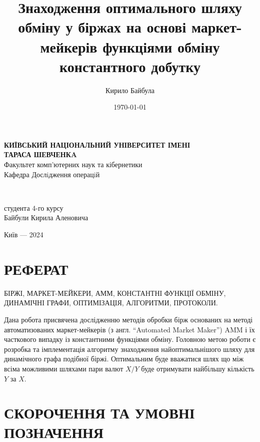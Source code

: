 \documentclass[14pt]{extarticle}
\author{Кирило Байбула}
\date{\today}
\title{Знаходження оптимального шляху обміну у біржах на основі маркет-мейкерів функціями обміну константного добутку}
\begin{document}
\begin{titlepage}
	\begin{center}
		\vspace*{1cm}

		\textbf{КИЇВСЬКИЙ НАЦІОНАЛЬНИЙ УНІВЕРСИТЕТ ІМЕНІ \\ ТАРАСА ШЕВЧЕНКA} \\
		Факультет комп'ютерних наук та кібернетики \\
		Кафедра Дослiдження операцiй

		\vspace{2.0cm}
		\textbf{\THETITLE} \\
		\vspace{1.5cm}
		\begin{flushright}
			студента 4-го курсу \\
			Байбули Кирила Аленовича
		\end{flushright}

		\vfill

		\vspace{0.8cm}
		Київ ---  2024
	\end{center}
\end{titlepage}
\newpage


\section*{РЕФЕРАТ}\label{sec:abstract}

БІРЖІ, МАРКЕТ-МЕЙКЕРИ, АММ, КОНСТАНТНІ ФУНКЦІЇ ОБМІНУ, ДИНАМІЧНІ ГРАФИ,
ОПТИМІЗАЦІЯ, АЛГОРИТМИ, ПРОТОКОЛИ.

Дана робота присвячена дослідженню методів обробки бірж основаних на методі
автоматизованих маркет-мейкерів (з англ. ``Automated Market Maker'') AMM і їх
часткового випадку із константними функціями обміну. Головною метою роботи є
розробка та імплементація алгоритму знаходження найоптимальнішого шляху для
динамічного графа подібної біржі. Оптимальним буде вважатися шлях що між всіма
можливими шляхами пари валют $X/Y$ буде отримувати найбільшу кількість $Y$ за
$X$.

\newpage

\renewcommand{\contentsname}{ЗМІСТ}
\setcounter{tocdepth}{2}
\tableofcontents
\newpage

\section*{СКОРОЧЕННЯ ТА УМОВНІ ПОЗНАЧЕННЯ}\label{sec:notation}
\end{document}
